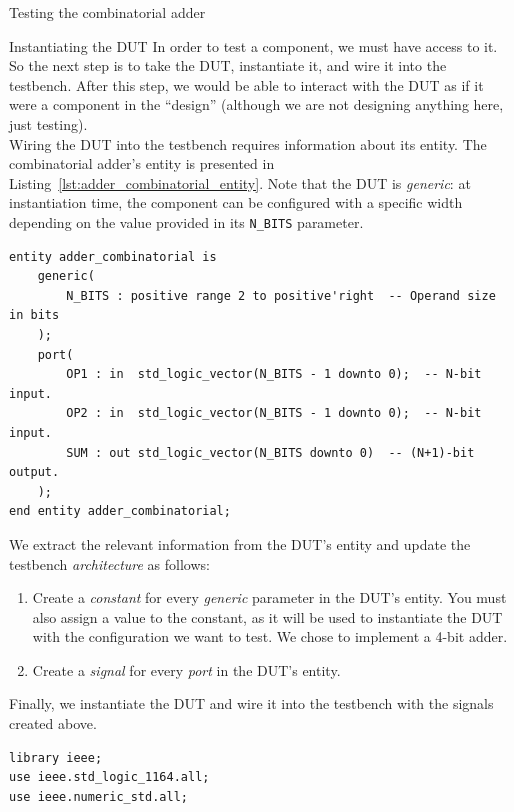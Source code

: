 \documentclass[lab]{course}
\begin{document}
\begin{section}{Testing the combinatorial adder}
    \clearpage

    \begin{subsection}{Instantiating the DUT}
        \label{sec:combinatorial_instantiating_dut}
        In order to test a component, we must have access to it. So the next step is to take the DUT, instantiate it, and wire it into the testbench. After this step, we would be able to interact with the DUT as if it were a component in the ``design'' (although we are not designing anything here, just testing). \\

        Wiring the DUT into the testbench requires information about its entity. The combinatorial adder's entity is presented in Listing~\ref{lst:adder_combinatorial_entity}. Note that the DUT is \emph{generic}: at instantiation time, the component can be configured with a specific width depending on the value provided in its \verb+N_BITS+ parameter.

        \begin{lstlisting}[caption={\texttt{adder\_combinatorial} entity}, captionpos=b, label={lst:adder_combinatorial_entity}]
entity adder_combinatorial is
    generic(
        N_BITS : positive range 2 to positive'right  -- Operand size in bits
    );
    port(
        OP1 : in  std_logic_vector(N_BITS - 1 downto 0);  -- N-bit input.
        OP2 : in  std_logic_vector(N_BITS - 1 downto 0);  -- N-bit input.
        SUM : out std_logic_vector(N_BITS downto 0)  -- (N+1)-bit output.
    );
end entity adder_combinatorial;
        \end{lstlisting}

        We extract the relevant information from the DUT's entity and update the testbench \emph{architecture} as follows:

        \begin{enumerate}
            \item Create a \emph{constant} for every \emph{generic} parameter in the DUT's entity. You must also assign a value to the constant, as it will be used to instantiate the DUT with the configuration we want to test. We chose to implement a 4-bit adder.
            \item Create a \emph{signal} for every \emph{port} in the DUT's entity.
        \end{enumerate}

        Finally, we instantiate the DUT and wire it into the testbench with the signals created above.

        \begin{lstlisting}[caption={Instantiate DUT}, captionpos=b, label={lst:combinatorial_instantiate_dut}]
library ieee;
use ieee.std_logic_1164.all;
use ieee.numeric_std.all;


\end{lstlisting}
\end{subsection}
\end{section}
\end{document}

